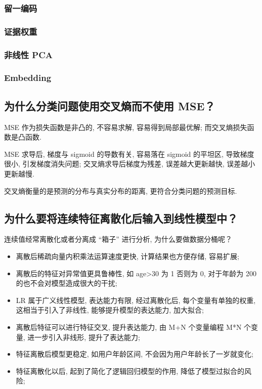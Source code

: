 \subsubsection{留一编码}

\subsubsection{证据权重}

\subsubsection{非线性 PCA}

\subsubsection{Embedding}

\subsection{为什么分类问题使用交叉熵而不使用 MSE？}
MSE 作为损失函数是非凸的, 不容易求解, 容易得到局部最优解; 而交叉熵损失函数是凸函数. 

MSE 求导后, 梯度与 sigmoid 的导数有关, 容易落在 sigmoid 的平坦区, 导致梯度很小, 引发梯度消失问题; 交叉熵求导后梯度为残差, 误差越大更新越快, 误差越小更新越慢. 

交叉熵衡量的是预测的分布与真实分布的距离, 更符合分类问题的预测目标.

\subsection{为什么要将连续特征离散化后输入到线性模型中？}
连续值经常离散化或者分离成 “箱子” 进行分析, 为什么要做数据分桶呢？
\begin{itemize}
	\item 离散后稀疏向量内积乘法运算速度更快, 计算结果也方便存储, 容易扩展; 
	
	\item 离散后的特征对异常值更具鲁棒性, 如 age>30 为 1 否则为 0, 对于年龄为 200 的也不会对模型造成很大的干扰; 
	
	\item LR 属于广义线性模型, 表达能力有限, 经过离散化后, 每个变量有单独的权重, 这相当于引入了非线性, 能够提升模型的表达能力, 加大拟合; 
	
	\item 离散后特征可以进行特征交叉, 提升表达能力, 由 M+N 个变量编程 M*N 个变量, 进一步引入非线形, 提升了表达能力; 
	
	\item 特征离散后模型更稳定, 如用户年龄区间, 不会因为用户年龄长了一岁就变化; 
	
	\item 特征离散化以后, 起到了简化了逻辑回归模型的作用, 降低了模型过拟合的风险; 
\end{itemize}


